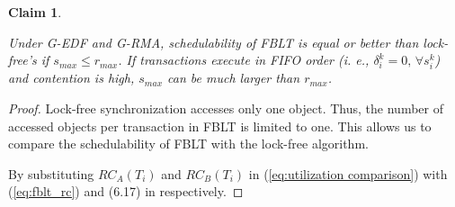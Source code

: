 \documentclass[a4paper,english]{article}
\newtheorem{clm}{Claim}
\newtheorem{proof}{Proof}
\begin{document}
\label{sec:fblt vs lock free}

\begin{clm}\label{clm:fblt_edf_lock-free}

Under G-EDF and G-RMA, schedulability of FBLT is equal or better than
lock-free's if $s_{max}\le r_{max}$. If transactions execute in FIFO
order (i. e., $\delta_{i}^{k}=0,\,\forall s_{i}^{k}$) and contention
is high, $s_{max}$ can be much larger than $r_{max}$.

\end{clm}

\begin{proof}\normalfont

Lock-free synchronization \cite{key-5,stmconcurrencycontrol:emsoft11}
accesses only one object. Thus, the number of accessed objects per
transaction in FBLT is limited to one. This allows us to compare the
schedulability of FBLT with the lock-free algorithm.

By substituting $RC_{A}(T_{i})$ and $RC_{B}(T_{i})$ in (\ref{eq:utilization comparison})
with (\ref{eq:fblt_rc}) and (6.17) in \cite{shambake_phd_proposal}
respectively. 


\end{proof}
\end{document}
